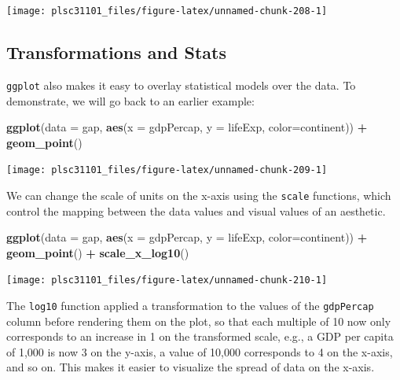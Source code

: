 \documentclass[]{book}
\newenvironment{Shaded}{\begin{snugshade}}{\end{snugshade}}
\newcommand{\KeywordTok}[1]{\textcolor[rgb]{0.13,0.29,0.53}{\textbf{#1}}}
\newcommand{\DataTypeTok}[1]{\textcolor[rgb]{0.13,0.29,0.53}{#1}}
\newcommand{\StringTok}[1]{\textcolor[rgb]{0.31,0.60,0.02}{#1}}
\newcommand{\OperatorTok}[1]{\textcolor[rgb]{0.81,0.36,0.00}{\textbf{#1}}}
\newcommand{\NormalTok}[1]{#1}
\begin{document}
\begin{center}\texttt{[image: plsc31101\_files/figure-latex/unnamed-chunk-208-1]} \end{center}

\subsection{Transformations and Stats}\label{transformations-and-stats}

\texttt{ggplot} also makes it easy to overlay statistical models over
the data. To demonstrate, we will go back to an earlier example:

\begin{Shaded}
\begin{Highlighting}[]
\KeywordTok{ggplot}\NormalTok{(}\DataTypeTok{data =}\NormalTok{ gap, }\KeywordTok{aes}\NormalTok{(}\DataTypeTok{x =}\NormalTok{ gdpPercap, }\DataTypeTok{y =}\NormalTok{ lifeExp, }\DataTypeTok{color=}\NormalTok{continent)) }\OperatorTok{+}\StringTok{ }
\StringTok{  }\KeywordTok{geom_point}\NormalTok{()}
\end{Highlighting}
\end{Shaded}

\begin{center}\texttt{[image: plsc31101\_files/figure-latex/unnamed-chunk-209-1]} \end{center}

We can change the scale of units on the x-axis using the \texttt{scale}
functions, which control the mapping between the data values and visual
values of an aesthetic.

\begin{Shaded}
\begin{Highlighting}[]
\KeywordTok{ggplot}\NormalTok{(}\DataTypeTok{data =}\NormalTok{ gap, }\KeywordTok{aes}\NormalTok{(}\DataTypeTok{x =}\NormalTok{ gdpPercap, }\DataTypeTok{y =}\NormalTok{ lifeExp, }\DataTypeTok{color=}\NormalTok{continent)) }\OperatorTok{+}\StringTok{ }
\StringTok{  }\KeywordTok{geom_point}\NormalTok{() }\OperatorTok{+}\StringTok{ }
\StringTok{  }\KeywordTok{scale_x_log10}\NormalTok{()}
\end{Highlighting}
\end{Shaded}

\begin{center}\texttt{[image: plsc31101\_files/figure-latex/unnamed-chunk-210-1]} \end{center}

The \texttt{log10} function applied a transformation to the values of
the \texttt{gdpPercap} column before rendering them on the plot, so that
each multiple of 10 now only corresponds to an increase in 1 on the
transformed scale, e.g., a GDP per capita of 1,000 is now 3 on the
y-axis, a value of 10,000 corresponds to 4 on the x-axis, and so on.
This makes it easier to visualize the spread of data on the x-axis.
\end{document}
